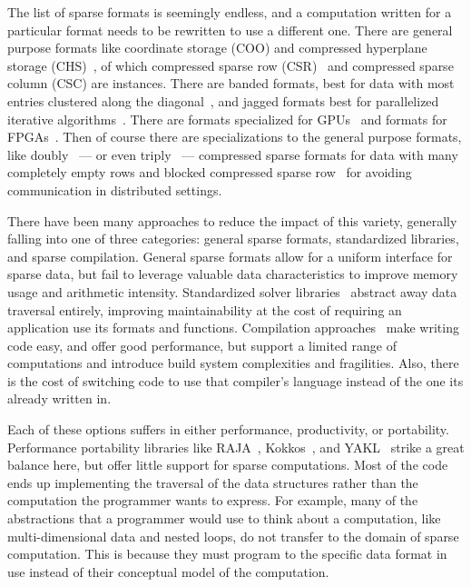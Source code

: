 The list of sparse formats is seemingly endless, and a computation written for a particular format needs to be rewritten to use a different one.
There are general purpose formats like coordinate storage (COO) and compressed hyperplane storage (CHS)~\cite{ahmed2000compiling}, of which compressed sparse row (CSR)~\cite{gustavson1972some} and compressed sparse column (CSC) are instances.
There are banded formats, best for data with most entries clustered along the diagonal~\cite{jennings1966compact}, and jagged formats best for parallelized iterative algorithms~\cite{saad1989krylov,montagne2004optimal}.
There are formats specialized for GPUs~\cite{fan2004gpu,bell2009implementing,bell2008efficient,monakov2010automatically} and formats for FPGAs~\cite{sun2007sparse,kestur2012towards,fowers2014high}.
Then of course there are specializations to the general purpose formats, like doubly~\cite{buluc2008representation} --- or even triply~\cite{mofrad2019efficient} --- compressed sparse formats for data with many completely empty rows and blocked compressed sparse row~\cite{vuduc2005fast} for avoiding communication in distributed settings.

There have been many approaches to reduce the impact of this variety, generally falling into one of three categories: general sparse formats, standardized libraries, and sparse compilation.
General sparse formats allow for a uniform interface for sparse data, but fail to leverage valuable data characteristics to improve memory usage and arithmetic intensity.
Standardized solver libraries~\cite{eisenstat1977yale,eisenstat1977yale2,eisenstat1984new,kincaid1982algorithm,chu1980user,george1984new,marsten1981design,saad1990sparskit,falgout2006design} abstract away data traversal entirely, improving maintainability at the cost of requiring an application use its formats and functions.
Compilation approaches~\cite{ahmed2000compiling,ahmed2000framework,bik1993automatic,bik1996automatic,bik2022compiler} make writing code easy, and offer good performance, but support a limited range of computations and introduce build system complexities and fragilities.
Also, there is the cost of switching code to use that compiler's language instead of the one its already written in.

Each of these options suffers in either performance, productivity, or portability.
Performance portability libraries like RAJA~\cite{hornung2014RAJA}, Kokkos~\cite{edwards2014kokkos}, and YAKL~\cite{norman2022portable} strike a great balance here, but offer little support for sparse computations.
Most of the code ends up implementing the traversal of the data structures rather than the computation the programmer wants to express.
For example, many of the abstractions that a programmer would use to think about a computation, like multi-dimensional data and nested loops, do not transfer to the domain of sparse computation.
This is because they must program to the specific data format in use instead of their conceptual model of the computation.


